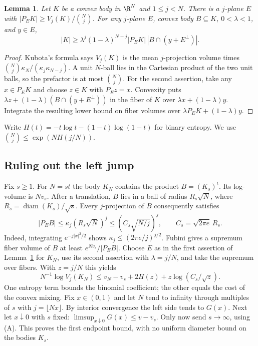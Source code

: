 \documentclass[11pt,a4paper]{article}
\numberwithin{equation}{section}
\newtheorem{lemma}[theorem]{Lemma}
\theoremstyle{definition}
\theoremstyle{remark}
\begin{document}
\begin{lemma}\label{r37heisei:geometry}
Let $K$ be a convex body in $\R^N$ and $1\le j<N$. There is a $j$-plane $E$ with $|P_EK|\ge V_j(K)/\binom Nj$. For any $j$-plane $E$, convex body $B\subseteq K$, $0<\lambda<1$, and $y\in E$,
\[
 |K|\ge \lambda^j(1-\lambda)^{N-j}|P_EK|\,
 |B\cap(y+E^\perp)|.
\]
\end{lemma}
\begin{proof}
Kubota's formula says $V_j(K)$ is the mean $j$-projection volume times $\binom Nj\kappa_N/(\kappa_j\kappa_{N-j})$. A unit $N$-ball lies in the Cartesian product of the two unit balls, so the prefactor is at most $\binom Nj$. For the second assertion, take any $x\in P_EK$ and choose $z\in K$ with $P_Ez=x$. Convexity puts
$\lambda z+(1-\lambda)(B\cap(y+E^\perp))$ in the fiber of $K$ over $\lambda x+(1-\lambda)y$. Integrate the resulting lower bound on fiber volumes over $\lambda P_EK+(1-\lambda)y$.
\end{proof}

Write $H(t)=-t\log t-(1-t)\log(1-t)$ for binary entropy. We use $\binom Nj\le\exp(NH(j/N))$.

\subsection{Ruling out the left jump}
Fix $s\ge1$. For $N=st$ the body $K_N$ contains the product $B=(K_s)^t$. Its log-volume is $Nv_s$. After a translation, $B$ lies in a ball of radius $R_s\sqrt N$, where $R_s=\operatorname{diam}(K_s)/\sqrt{s}$. Every $j$-projection of $B$ consequently satisfies
\[
 |P_EB|\le\kappa_j(R_s\sqrt N)^j\le (C_s\sqrt{N/j})^j,
 \qquad C_s=\sqrt{2\pi e}\,R_s .
\]
Indeed, integrating $e^{-j|x|^2/2}$ shows $\kappa_j\le(2\pi e/j)^{j/2}$. Fubini gives a supremum fiber volume of $B$ at least $e^{Nv_s}/|P_EB|$. Choose $E$ as in the first assertion of Lemma~\ref{r37heisei:geometry} for $K_N$, use its second assertion with $\lambda=j/N$, and take the supremum over fibers. With $z=j/N$ this yields
\begin{equation}
 N^{-1}\log V_j(K_N)
 \le v_N-v_s+2H(z)+z\log(C_s/\sqrt z).
 \label{r37heisei:left}
\end{equation}
One entropy term bounds the binomial coefficient; the other equals the cost of the convex mixing. Fix $x\in(0,1)$ and let $N$ tend to infinity through multiples of $s$ with $j=\lfloor Nx\rfloor$. By interior convergence the left side tends to $G(x)$. Next let $x\downarrow0$ with $s$ fixed: $\limsup_{x\downarrow0}G(x)\le v-v_s$. Only now send $s\to\infty$, using (A). This proves the first endpoint bound, with no uniform diameter bound on the bodies $K_s$.
\end{document}
